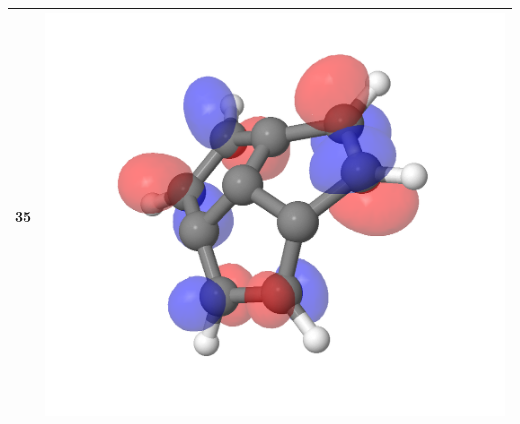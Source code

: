 \documentclass{article}
\begin{document}
\begin{tabular}{|c|c|}
35 & \includegraphics[scale=0.3]{M1S_35.png}\\ \hline
\end{tabular}
\end{document}
